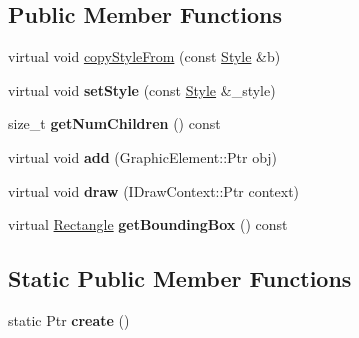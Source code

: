 \subsection*{Public Member Functions}
\begin{DoxyCompactItemize}
\item 
virtual void \hyperlink{classsambag_1_1disco_1_1graphic_elements_1_1_compound_a7a36ede1ba0ed02f7928d03a8dbaa36e}{copyStyleFrom} (const \hyperlink{classsambag_1_1disco_1_1graphic_elements_1_1_style}{Style} \&b)
\item 
\hypertarget{classsambag_1_1disco_1_1graphic_elements_1_1_compound_af5d80d77106b3bed9da7941d3cc94785}{
virtual void {\bfseries setStyle} (const \hyperlink{classsambag_1_1disco_1_1graphic_elements_1_1_style}{Style} \&\_\-style)}
\label{classsambag_1_1disco_1_1graphic_elements_1_1_compound_af5d80d77106b3bed9da7941d3cc94785}

\item 
\hypertarget{classsambag_1_1disco_1_1graphic_elements_1_1_compound_adc75502f599a1b9d60f79277d71f63ae}{
size\_\-t {\bfseries getNumChildren} () const }
\label{classsambag_1_1disco_1_1graphic_elements_1_1_compound_adc75502f599a1b9d60f79277d71f63ae}

\item 
\hypertarget{classsambag_1_1disco_1_1graphic_elements_1_1_compound_acf9313f534408e838484f2aae5974b9d}{
virtual void {\bfseries add} (GraphicElement::Ptr obj)}
\label{classsambag_1_1disco_1_1graphic_elements_1_1_compound_acf9313f534408e838484f2aae5974b9d}

\item 
\hypertarget{classsambag_1_1disco_1_1graphic_elements_1_1_compound_a67b83de2dd7a640751eb5911d3cbfbea}{
virtual void {\bfseries draw} (IDrawContext::Ptr context)}
\label{classsambag_1_1disco_1_1graphic_elements_1_1_compound_a67b83de2dd7a640751eb5911d3cbfbea}

\item 
\hypertarget{classsambag_1_1disco_1_1graphic_elements_1_1_compound_a280b0ff0aeec431bc2c4ff40a62ca84c}{
virtual \hyperlink{classsambag_1_1com_1_1_rectangle}{Rectangle} {\bfseries getBoundingBox} () const }
\label{classsambag_1_1disco_1_1graphic_elements_1_1_compound_a280b0ff0aeec431bc2c4ff40a62ca84c}

\end{DoxyCompactItemize}
\subsection*{Static Public Member Functions}
\begin{DoxyCompactItemize}
\item 
\hypertarget{classsambag_1_1disco_1_1graphic_elements_1_1_compound_a621edf232bd598eaadeccbffec3556eb}{
static Ptr {\bfseries create} ()}
\label{classsambag_1_1disco_1_1graphic_elements_1_1_compound_a621edf232bd598eaadeccbffec3556eb}

\end{DoxyCompactItemize}



